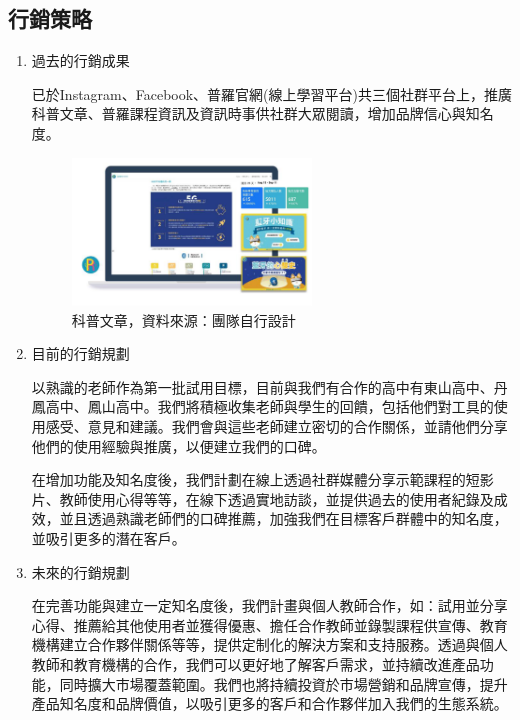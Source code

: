 \subsection{行銷策略}

\begin{enumerate}[label=(\arabic*)]
  \setlength{\parindent}{2em}
  \item 過去的行銷成果
    \par 已於Instagram、Facebook、普羅官網(線上學習平台)共三個社群平台上，推廣科普文章、普羅課程資訊及資訊時事供社群大眾閱讀，增加品牌信心與知名度。
    \begin{figure}[H]
      \centering
      \includegraphics[width=0.6\textwidth]{./Strategies/img/article.png}
      \caption{科普文章，資料來源：團隊自行設計}
  	\end{figure}
  \item 目前的行銷規劃
  	\par 以熟識的老師作為第一批試用目標，目前與我們有合作的高中有東山高中、丹鳳高中、鳳山高中。我們將積極收集老師與學生的回饋，包括他們對工具的使用感受、意見和建議。我們會與這些老師建立密切的合作關係，並請他們分享他們的使用經驗與推廣，以便建立我們的口碑。
  	\par 在增加功能及知名度後，我們計劃在線上透過社群媒體分享示範課程的短影片、教師使用心得等等，在線下透過實地訪談，並提供過去的使用者紀錄及成效，並且透過熟識老師們的口碑推薦，加強我們在目標客戶群體中的知名度，並吸引更多的潛在客戶。
  \item 未來的行銷規劃
  	\par 在完善功能與建立一定知名度後，我們計畫與個人教師合作，如：試用並分享心得、推薦給其他使用者並獲得優惠、擔任合作教師並錄製課程供宣傳、教育機構建立合作夥伴關係等等，提供定制化的解決方案和支持服務。透過與個人教師和教育機構的合作，我們可以更好地了解客戶需求，並持續改進產品功能，同時擴大市場覆蓋範圍。我們也將持續投資於市場營銷和品牌宣傳，提升產品知名度和品牌價值，以吸引更多的客戶和合作夥伴加入我們的生態系統。
\end{enumerate}
